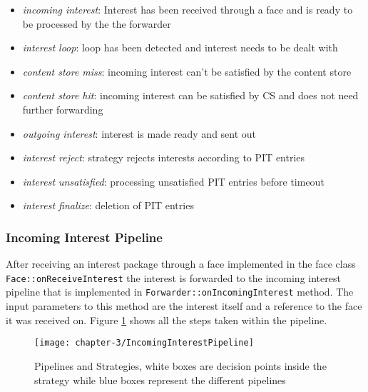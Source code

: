 \begin{itemize}
\item \emph{incoming interest}: Interest has been received through a face and is ready to be processed by the the forwarder
\item \emph{interest loop}: loop has been detected and interest needs to be dealt with
\item \emph{content store miss}: incoming interest can't be satisfied by the content store
\item \emph{content store hit}: incoming interest can be satisfied by CS and does not need further forwarding 
\item \emph{outgoing interest}: interest is made ready and sent out
\item \emph{interest reject}: strategy rejects interests according to PIT entries
\item \emph{interest unsatisfied}: processing unsatisfied PIT entries before timeout
\item \emph{interest finalize}: deletion of PIT entries
\end{itemize}

\subsubsection{Incoming Interest Pipeline}

After receiving an interest package through a face implemented in the face class \texttt{Face::onReceiveInterest} the interest is forwarded to the incoming interest pipeline that is implemented in \texttt{Forwarder::onIncomingInterest} method. The input parameters to this method are the interest itself and a reference to the face it was received on. Figure \ref{fig:IncomingInterestPipeline} shows all the steps taken within the pipeline.

\begin{figure}[H]
  \centering
  \texttt{[image: chapter-3/IncomingInterestPipeline]}
  \caption{Pipelines and Strategies, white boxes are decision points inside the strategy while blue boxes represent the different pipelines}
  \label{fig:IncomingInterestPipeline}
\end{figure}

